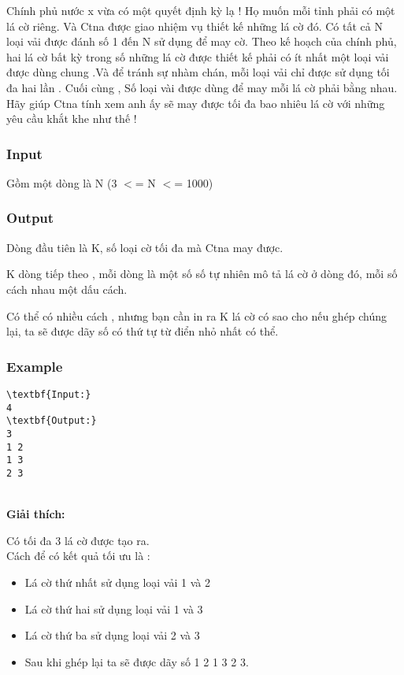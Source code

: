 

Chính phủ nước x vừa có một quyết định kỳ lạ ! Họ muốn mỗi tỉnh phải có một lá cờ riêng. Và Ctna được giao nhiệm vụ thiết kế những lá cờ đó. Có tất cả N loại vải được đánh số 1 đến N sử dụng để may cờ. Theo kế hoạch của chính phủ, hai lá cờ bất kỳ trong số những lá cờ được thiết kế phải có ít nhất một loại vải được dùng chung .Và để tránh sự nhàm chán, mỗi loại vải chỉ được sử dụng tối đa hai lần . Cuối cùng , Số loại vài được dùng để may mỗi lá cờ phải bằng nhau. Hãy giúp Ctna tính xem anh ấy sẽ may được tối đa bao nhiêu lá cờ với những yêu cầu khắt khe như thế !

\subsubsection{Input}

Gồm một dòng là N (3 $<$= N $<$= 1000)

\subsubsection{Output}

Dòng đầu tiên là K, số loại cờ tối đa mà Ctna may được.

K dòng tiếp theo , mỗi dòng là một số số tự nhiên mô tả lá cờ ở dòng đó, mỗi số cách nhau một dấu cách.

Có thể có nhiều cách , nhưng bạn cần in ra K lá cờ có sao cho nếu ghép chúng lại, ta sẽ được dãy số có thứ tự từ điển nhỏ nhất có thể.

\subsubsection{Example}
\begin{verbatim}
\textbf{Input:}
4
\textbf{Output:}
3
1 2
1 3
2 3\end{verbatim}


\\\textbf{Giải thích:}

Có tối đa 3 lá cờ được tạo ra.
\\Cách để có kết quả tối ưu là :
\begin{itemize}
	\item Lá cờ thứ nhất sử dụng loại vải 1 và 2
	\item Lá cờ thứ hai sử dụng loại vải 1 và 3
	\item Lá cờ thứ ba sử dụng loại vải 2 và 3
	\item Sau khi ghép lại ta sẽ được dãy số 1 2 1 3 2 3.
\end{itemize}